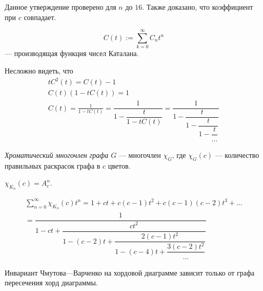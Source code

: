 \documentclass[12pt,a4paper]{article}
\begin{document}
    \begin{remark}
        Данное утверждение проверено для $n$ до $16$. Также доказано, что коэффициент при $c$ совпадает.
    \end{remark}

    \begin{definition}
        \[C(t) := \sum_{k=0}^\infty C_n t^n\]
        --- производящая функция чисел Каталана.
    \end{definition}

    Несложно видеть, что
    \begin{gather*}
        t C^2(t) = C(t) - 1\\
        C(t)(1 - t C(t)) = 1\\
        C(t)
        = \frac{1}{1 - t C(t)}
        = \dfrac{1}{
            1 - \dfrac{t}{
                1 - t C(t)
            }
        }
        = \dfrac{1}{
            1 - \dfrac{t}{
                1 - \dfrac{t}{
                    1 - \dfrac{t}{
                        \dots
                    }
                }
            }
        }
    \end{gather*}

    \begin{definition}
        \emph{Хроматический многочлен графа $G$} --- многочлен $\chi_G$, где $\chi_G(c)$ --- количество правильных раскрасок графа в $c$ цветов.
    \end{definition}

    \begin{example}
        $\chi_{K_n}(c) = A_c^n$.
    \end{example}

    \begin{exercise}
        \begin{gather*}
            \sum_{n=0}^\infty \chi_{K_n}(c) t^n = 1 + ct + c(c-1)t^2 + c(c-1)(c-2) t^3 + \dots\\
            = \dfrac{1}{
                1 - ct + \dfrac{ct^2}{
                    1 - (c-2) t + \dfrac{2(c-1) t^2}{
                        1 - (c-4) t + \dfrac{3(c-2) t^2}{
                            \dots
                        }
                    }
                }
            }
        \end{gather*}
    \end{exercise}

    \begin{theorem}
        Инвариант Чмутова---Варченко на хордовой диаграмме зависит только от графа пересечения хорд диаграммы.
    \end{theorem}
\end{document}
